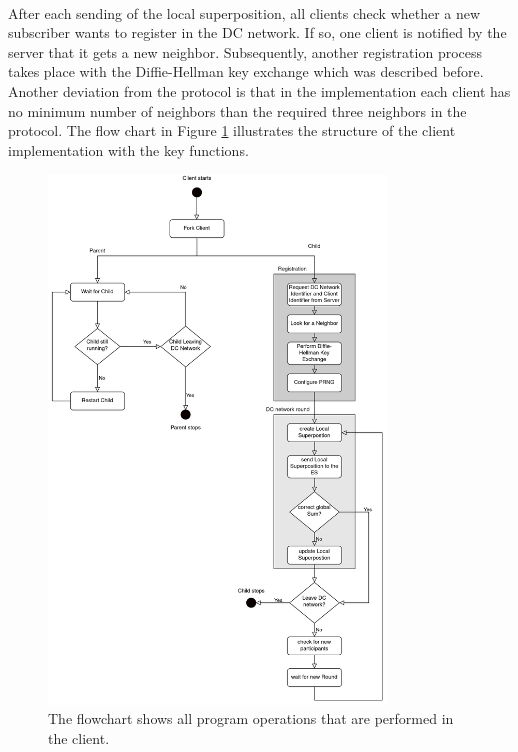 \\
After each sending of the local superposition, all clients check whether a new subscriber wants to register in the DC network. If so, one client is notified by the server that it gets a new neighbor. Subsequently, another registration process takes place with the Diffie-Hellman key exchange which was described before. Another deviation from the protocol is that in the implementation each client has no minimum number of neighbors than the required three neighbors in the protocol. The flow chart in Figure \ref{fig:Client Implementation} illustrates the structure of the client implementation with the key functions.
\begin{figure}[tbp]
  \centering
  \includegraphics[width=0.8\textwidth]{images/Client_structure2.png}
  \caption[Flowchart Client Implementatioen]{The flowchart shows all program operations that are performed in the client.}
  \label{fig:Client Implementation}
\end{figure}

